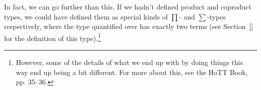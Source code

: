 In fact, we can go further than this.  If we hadn't defined product and coproduct types, we could have defined them as special kinds of $\prod$- and $\sum$-types respectively, where the type quantified over has exactly two terms (see Section~\ref{} for the definition of this type).\footnote{However, some of the details of what we end up with by doing things this way end up being a bit different.  For more about this, see the HoTT Book, pp. 35--36.
}
%






%



